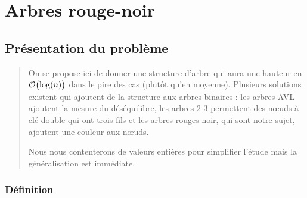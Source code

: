 \chapter{Arbres rouge-noir}
\thispagestyle{empty}
\section{Présentation du problème}
\begin{abstract}
On se propose ici de donner une structure d'arbre qui aura une hauteur en ${\cal O}\bigl(\log(n)\bigr)$ dans le pire des cas (plutôt qu'en moyenne). Plusieurs solutions existent qui ajoutent de la structure aux arbres binaires : les arbres AVL ajoutent la mesure du déséquilibre, les arbres 2-3 permettent des nœuds à clé double qui ont trois fils et les arbres rouges-noir, qui sont notre sujet, ajoutent une couleur aux nœuds. 

Nous nous contenterons de valeurs entières pour simplifier l'étude mais la généralisation est immédiate.
\end{abstract}
\subsection{Définition}

